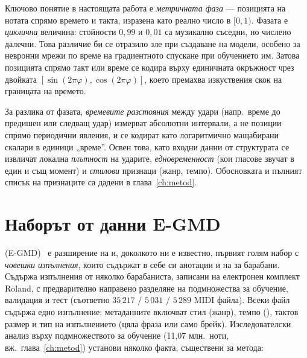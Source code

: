 Ключово понятие в настоящата работа е \emph{метричната фаза} — позицията на нотата спрямо
времето и такта, изразена като реално число в $[0,1)$. Фазата е \emph{циклична}
величина: стойности $0{,}99$ и $0{,}01$ са музикално съседни, но числено далечни.
Това различие би се отразило зле при създаване на модели, особено за невронни мрежи
по време на градиентното спускане при обучението им.
Затова позицията спрямо такт или време се кодира върху единичната окръжност
чрез двойката $[\sin(2\pi\varphi),\cos(2\pi\varphi)]$, което премахва изкуствения скок на
границата на времето.

За разлика от фазата, \emph{времевите разстояния} между
удари (напр.\ време до предишен или следващ удар) измерват абсолютни интервали, а
не позиции спрямо периодични явления, и се кодират като логаритмично мащабирани скалари в
единици „време''. Освен това, като входни данни от структурата се извличат локална \emph{плътност}
на ударите, \emph{едновременност} (кои гласове звучат в един и същ момент) и
\emph{стилови} признаци (жанр, темпо). Обосновката и пълният списък на признаците
са дадени в глава~\ref{ch:metod}.

\section{Наборът от данни E-GMD}
\label{sec:egmd}

 (E-GMD)~\cite{callender2020egmd} е разширение на
 и, доколкото ни е известно, първият голям набор с
\emph{човешки изпълнения}, които съдържат в себе си анотации и на  за барабани.
Съдържа изпълнения от няколко барабаниста, записани на електронен комплект Roland,
с предварително направено разделяне на подмножества за обучение, валидация и тест
(съответно $35\,217$ / $5\,031$ / $5\,289$ MIDI файла). Всеки файл съдържа едно
изпълнение; метаданните включват стил (жанр), темпо (), тактов
размер и тип на изпълнението (цяла фраза или само брейк).
Изследователски анализ върху подмножеството за обучение (11{,}07 млн.\ ноти,
вж.\ глава~\ref{ch:metod}) установи няколко
факта, съществени за метода:

